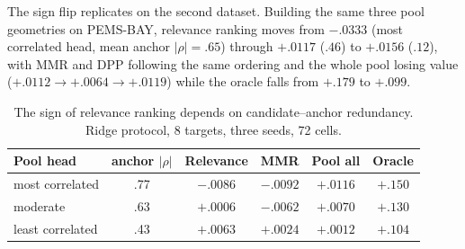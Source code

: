 The sign flip replicates on the second dataset. Building the same three pool
geometries on PEMS-BAY, relevance ranking moves from $-.0333$ (most correlated
head, mean anchor $|\rho|=.65$) through $+.0117$ ($.46$) to $+.0156$ ($.12$),
with MMR and DPP following the same ordering and the whole pool losing value
($+.0112 \to +.0064 \to +.0119$) while the oracle falls from $+.179$ to $+.099$.

\begin{table}[t]
 \centering
 \footnotesize
 \caption{The sign of relevance ranking depends on candidate--anchor
 redundancy. Ridge protocol, 8 targets, three seeds, 72 cells.}
 \label{tab:pool-modes}
 \begin{tabular}{lccccc}
  \toprule
  Pool head & anchor $|\rho|$ & Relevance & MMR & Pool all & Oracle\\
  \midrule
  most correlated & .77 & $-.0086$ & $-.0092$ & $+.0116$ & $+.150$\\
  moderate & .63 & $+.0006$ & $-.0062$ & $+.0070$ & $+.130$\\
  least correlated & .43 & $+.0063$ & $+.0024$ & $+.0012$ & $+.104$\\
  \bottomrule \end{tabular}
\end{table}

